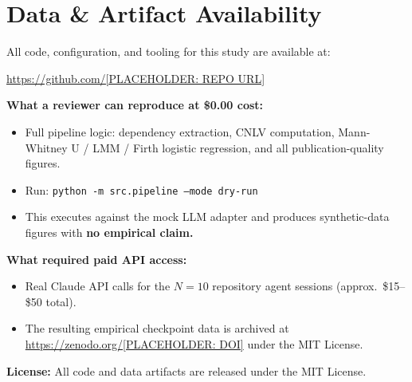 \documentclass[11pt]{article}
\begin{document}
\section{Data \& Artifact Availability}
\label{sec:availability}

All code, configuration, and tooling for this study are available at:
\begin{center}
    \url{https://github.com/[PLACEHOLDER: REPO URL]}
\end{center}

\textbf{What a reviewer can reproduce at \$0.00 cost:}
\begin{itemize}
    \item Full pipeline logic: dependency extraction, CNLV computation,
    Mann-Whitney U / LMM / Firth logistic regression, and all
    publication-quality figures.
    \item Run: \texttt{python -m src.pipeline --mode dry-run}
    \item This executes against the mock LLM adapter and produces
    synthetic-data figures with \textbf{no empirical claim.}
\end{itemize}

\textbf{What required paid API access:}
\begin{itemize}
    \item Real Claude API calls for the $N = 10$ repository agent
    sessions (approx.~\$15--\$50 total).
    \item The resulting empirical checkpoint data is archived at
    \url{https://zenodo.org/[PLACEHOLDER: DOI]} under the MIT License.
\end{itemize}

\textbf{License:} All code and data artifacts are released under the
MIT License.


\end{document}
